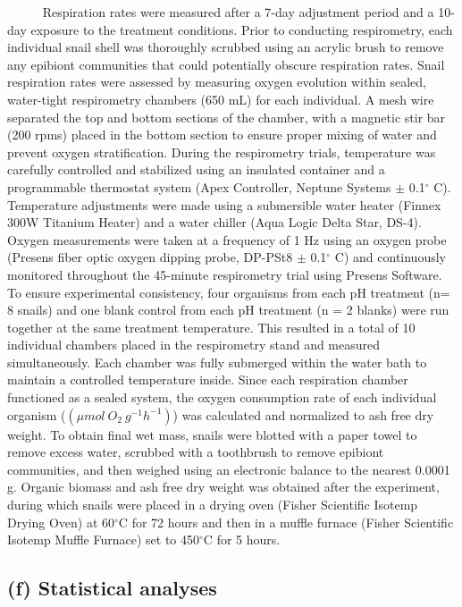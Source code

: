 \documentclass[
  12pt,
]{article}
\begin{document}
~~~~~ Respiration rates were measured after a 7-day adjustment period
and a 10-day exposure to the treatment conditions. Prior to conducting
respirometry, each individual snail shell was thoroughly scrubbed using
an acrylic brush to remove any epibiont communities that could
potentially obscure respiration rates. Snail respiration rates were
assessed by measuring oxygen evolution within sealed, water-tight
respirometry chambers (650 mL) for each individual. A mesh wire
separated the top and bottom sections of the chamber, with a magnetic
stir bar (200 rpms) placed in the bottom section to ensure proper mixing
of water and prevent oxygen stratification. During the respirometry
trials, temperature was carefully controlled and stabilized using an
insulated container and a programmable thermostat system (Apex
Controller, Neptune Systems \(\pm\) 0.1\(^\circ\) C). Temperature
adjustments were made using a submersible water heater (Finnex 300W
Titanium Heater) and a water chiller (Aqua Logic Delta Star, DS-4).
Oxygen measurements were taken at a frequency of 1 Hz using an oxygen
probe (Presens fiber optic oxygen dipping probe, DP-PSt8 \(\pm\)
0.1\(^\circ\) C) and continuously monitored throughout the 45-minute
respirometry trial using Presens Software. To ensure experimental
consistency, four organisms from each pH treatment (n= 8 snails) and one
blank control from each pH treatment (n = 2 blanks) were run together at
the same treatment temperature. This resulted in a total of 10
individual chambers placed in the respirometry stand and measured
simultaneously. Each chamber was fully submerged within the water bath
to maintain a controlled temperature inside. Since each respiration
chamber functioned as a sealed system, the oxygen consumption rate of
each individual organism (\((\mu mol \: O_2 \: g^{-1}h^{-1})\)) was
calculated and normalized to ash free dry weight. To obtain final wet
mass, snails were blotted with a paper towel to remove excess water,
scrubbed with a toothbrush to remove epibiont communities, and then
weighed using an electronic balance to the nearest 0.0001 g. Organic
biomass and ash free dry weight was obtained after the experiment,
during which snails were placed in a drying oven (Fisher Scientific
Isotemp Drying Oven) at 60\(^\circ\)C for 72 hours and then in a muffle
furnace (Fisher Scientific Isotemp Muffle Furnace) set to 450\(^\circ\)C
for 5 hours.

\hypertarget{f-statistical-analyses}{%
\subsection{(f) Statistical analyses}\label{f-statistical-analyses}}
\end{document}
